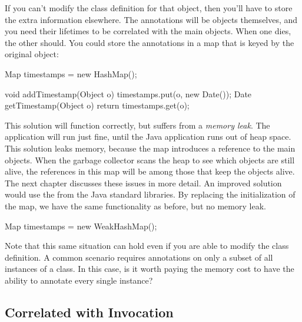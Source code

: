 If you can't modify the class definition for that object, then you'll have to
store the extra information elsewhere. The annotations will be objects
themselves, and you need their lifetimes to be correlated with the main objects.
When one dies, the other should. You could store the annotations in a
map that is keyed by the original object:

\begin{shortlisting}
Map timestamps = new HashMap();

void addTimestamp(Object o) {
	timestamps.put(o, new Date());
}
Date getTimestamp(Object o) {
	return timestamps.get(o);
}
\end{shortlisting}

This solution will function correctly, but suffers from a \emph{memory
leak}. The application will run just fine, until the Java
application runs out of heap space. This solution leaks memory, because the
 map introduces a reference to the main objects. When the
garbage collector scans the heap to see which objects are still alive, the
references in this map will be among those that keep the objects alive. The next
chapter discusses these issues in more detail. An improved solution would use the
 from the Java standard libraries. By replacing the
initialization of the  map, we have the same functionality as
before, but no memory leak.

\begin{shortlisting}
Map timestamps = new WeakHashMap();
\end{shortlisting}

Note that this same situation can hold even if you are able to modify the class
definition. A common scenario requires annotations on only a subset of all
instances of a class. In this case, is it worth paying the memory cost to have
the ability to annotate every single instance?

\subsection{Correlated with Invocation}
\label{correlated-lifetime-2}

